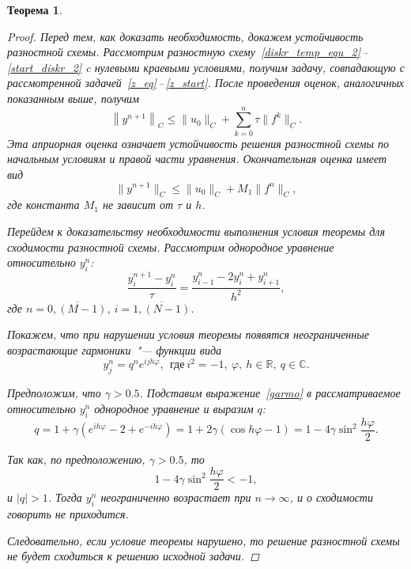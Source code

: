 \documentclass[11pt,a4paper,twoside]{report}
\numberwithin{equation}{section}
\theoremstyle{definition}
\theoremstyle{plain}
\newtheorem*{theorem*}{Теорема}
\begin{document}
\begin{theorem*}
\begin{proof}
        Перед тем, как доказать необходимость, докажем устойчивость разностной
        схемы. Рассмотрим разностную схему~\eqref{diskr_temp_equ_2}\,--\,\eqref{start_diskr_2} c нулевыми краевыми условиями, получим задачу,
        совпадающую с рассмотренной задачей~\eqref{z_eq}\,--\,\eqref{z_start}.
        После проведения оценок, аналогичных показанным выше, получим
        $$
            \left\|y^{n+1}\right\|_C \leqslant \big\|u_0\big\|_C
            + \sum\limits_{k=0}^n \tau\big\|f^k\big\|_C.
        $$
        Эта априорная оценка означает устойчивость решения разностной схемы по
        начальным условиям и правой части уравнения. Окончательная оценка имеет вид
        $$
            \big\|y^{n+1}\big\|_C \leqslant \big\|u_0\big\|_C
            + M_1\big\|f^n\big\|_C,
        $$
        где константа $M_1$ не зависит от $\tau$ и $h$.

        Перейдем к доказательству необходимости выполнения условия теоремы для
        сходимости разностной схемы. Рассмотрим однородное уравнение
        относительно $y_i^n$:
        $$
            \dfrac{y_i^{n+1} - y_i^n}{\tau} = \dfrac{y^n_{i-1} - 2y_i^n + y_{i+1}^n}{h^2},
        $$
        где $n=\overline{0,(M-1)},~i=\overline{1,(N-1)}$.

        Покажем, что при нарушении условия теоремы появятся неограниченные
        возрастающие гармоники~"--- функции вида
        \begin{equation}
            \label{garmo}
            y_j^n = q^n e^{ijh\varphi},~~\text{где}~i^2 = -1,
            ~\varphi,~h \in \mathbb{R},~q \in \mathbb{C}.
        \end{equation}

        Предположим, что $\gamma > 0.5$.
        Подставим выражение~\eqref{garmo} в рассматриваемое относительно $y_i^n$
        однородное уравнение и выразим $q$:
        $$
            q = 1 + \gamma\left(e^{ih\varphi} - 2 + e^{-ih\varphi}\right) = 1 +
            2\gamma\left(\cos h\varphi - 1\right) = 1 -
            4\gamma\sin^2\dfrac{h\varphi}{2}.
        $$

        Так как, по предположению, $\gamma > 0.5$, то
        $$
            1 - 4 \gamma \sin^2\dfrac{h\varphi}{2} < -1,
        $$
        и $|q| > 1$. Тогда $y_i^n$ неограниченно возрастает при
        $n\rightarrow\infty$, и о сходимости говорить не приходится.

        Следовательно, если условие теоремы нарушено, то решение разностной
        схемы не будет сходиться к решению исходной задачи.
    \end{proof}
%
\end{theorem*}
\end{document}
